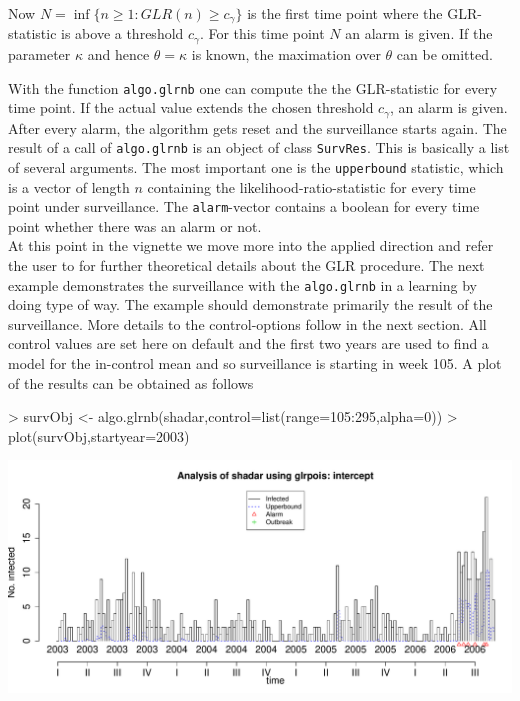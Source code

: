 \documentclass[a4paper,11pt]{article}
\begin{document}
Now $N=\inf \{n \geq 1 : GLR(n) \geq c_{\gamma} \}$ is the first time point where the GLR-statistic is above a threshold $c_{\gamma}$. For this time point $N$ an alarm is given. If the parameter $\kappa$ and hence $\theta=\kappa$ is known, the maximation over $\theta$ can be omitted.

With the function \verb+algo.glrnb+ one can compute the the GLR-statistic for every time point. If the actual value extends the chosen threshold $c_{\gamma}$, an alarm is given. After every alarm, the algorithm gets reset and the surveillance starts again. The result of a call of \verb+algo.glrnb+ is an object of class \verb+SurvRes+. This is basically a list of several arguments. The most important one is the \verb+upperbound+ statistic, which is a vector of length $n$ containing the likelihood-ratio-statistic for every time point under surveillance. The \verb+alarm+-vector contains a boolean for every time point whether there was an alarm or not. \\ 
 

At this point in the vignette we move more into the applied direction and refer the user to \citet{hoehle2008} for further theoretical details about the GLR procedure. The next example demonstrates the surveillance with the \verb+algo.glrnb+ in a learning by doing type of way. The example should demonstrate primarily the result of the surveillance. More details to the control-options follow in the next section. All control values are set here on default and the first two years are used to find a model for the in-control mean and so surveillance is starting in week 105. A plot of the results can be obtained as follows

\begin{Schunk}
\begin{Sinput}
> survObj <- algo.glrnb(shadar,control=list(range=105:295,alpha=0))
> plot(survObj,startyear=2003)
\end{Sinput}
\end{Schunk}
\includegraphics{figs/vignette_glrnb-005}
\end{document}
